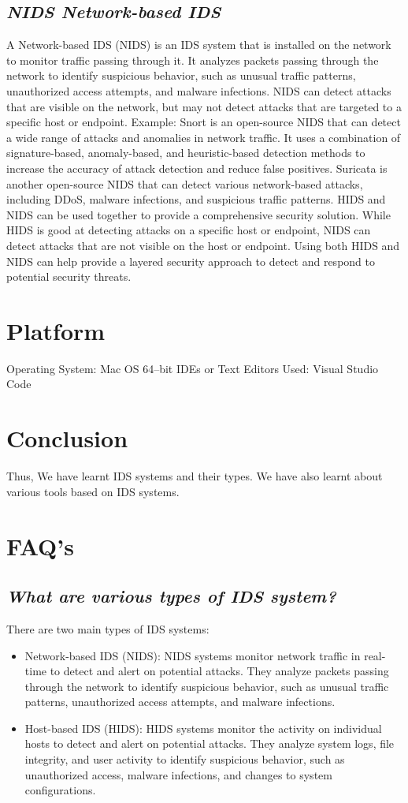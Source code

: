 \documentclass{article}
\begin{document}
\subsection{\textit{NIDS \- Network-based IDS}}
A Network-based IDS (NIDS) is an IDS system that is installed on the network to monitor traffic passing through it. It analyzes packets passing through the network to identify suspicious behavior, such as unusual traffic patterns, unauthorized access attempts, and malware infections. NIDS can detect attacks that are visible on the network, but may not detect attacks that are targeted to a specific host or endpoint.
Example: Snort is an open-source NIDS that can detect a wide range of attacks and anomalies in network traffic. It uses a combination of signature-based, anomaly-based, and heuristic-based detection methods to increase the accuracy of attack detection and reduce false positives. Suricata is another open-source NIDS that can detect various network-based attacks, including DDoS, malware infections, and suspicious traffic patterns.
HIDS and NIDS can be used together to provide a comprehensive security solution. While HIDS is good at detecting attacks on a specific host or endpoint, NIDS can detect attacks that are not visible on the host or endpoint. Using both HIDS and NIDS can help provide a layered security approach to detect and respond to potential security threats.

\section{\textbf{Platform}}
Operating System: Mac OS 64--bit
IDEs or Text Editors Used: Visual Studio Code

\section{\textbf{Conclusion}}
Thus, We have learnt IDS systems and their types. We have also learnt about various tools based on
IDS systems.
\section{\textbf{FAQ's}}
\subsection{\textit{What are various types of IDS system?}}
There are two main types of IDS systems:
\begin{itemize}
	\item Network-based IDS (NIDS): NIDS systems monitor network traffic in real-time to detect and alert on potential attacks. They analyze packets passing through the network to identify suspicious behavior, such as unusual traffic patterns, unauthorized access attempts, and malware infections.
	\item Host-based IDS (HIDS): HIDS systems monitor the activity on individual hosts to detect and alert on potential attacks. They analyze system logs, file integrity, and user activity to identify suspicious behavior, such as unauthorized access, malware infections, and changes to system configurations.
	
\end{itemize}
\end{document}
